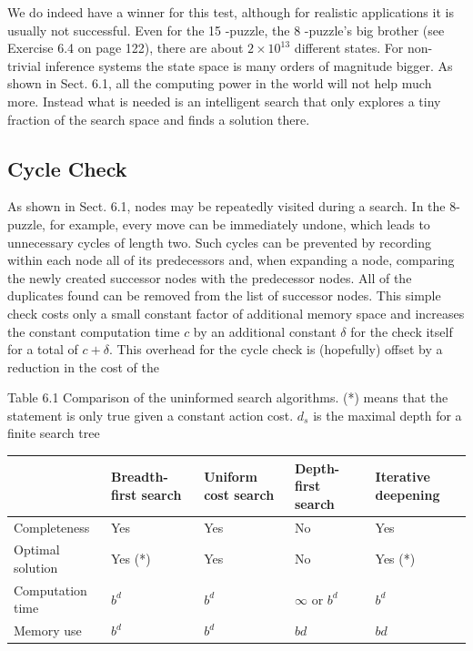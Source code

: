 \documentclass[10pt]{book}
\begin{document}
We do indeed have a winner for this test, although for realistic applications it is usually not successful. Even for the 15 -puzzle, the 8 -puzzle's big brother (see Exercise 6.4 on page 122), there are about $2 \times 10^{13}$ different states. For non-trivial inference systems the state space is many orders of magnitude bigger. As shown in Sect. 6.1, all the computing power in the world will not help much more. Instead what is needed is an intelligent search that only explores a tiny fraction of the search space and finds a solution there.

\subsection{Cycle Check}
As shown in Sect. 6.1, nodes may be repeatedly visited during a search. In the 8-puzzle, for example, every move can be immediately undone, which leads to unnecessary cycles of length two. Such cycles can be prevented by recording within each node all of its predecessors and, when expanding a node, comparing the newly created successor nodes with the predecessor nodes. All of the duplicates found can be removed from the list of successor nodes. This simple check costs only a small constant factor of additional memory space and increases the constant computation time $c$ by an additional constant $\delta$ for the check itself for a total of $c+\delta$. This overhead for the cycle check is (hopefully) offset by a reduction in the cost of the

Table 6.1 Comparison of the uninformed search algorithms. (*) means that the statement is only true given a constant action cost. $d_{s}$ is the maximal depth for a finite search tree

\begin{center}
\begin{tabular}{|l|l|l|l|l|}
\hline
 & Breadth-first search & Uniform cost search & Depth-first search & Iterative deepening \\
\hline
Completeness & Yes & Yes & No & Yes \\
\hline
Optimal solution & Yes (*) & Yes & No & Yes (*) \\
\hline
Computation time & $b^{d}$ & $b^{d}$ & $\infty$ or $b^{d}$ & $b^{d}$ \\
\hline
Memory use & $b^{d}$ & $b^{d}$ & $b d$ & $b d$ \\
\hline
\end{tabular}
\end{center}
\end{document}
